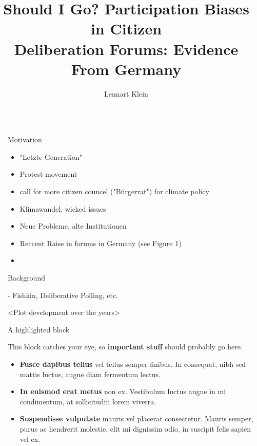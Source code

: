 \documentclass[final]{beamer}
\title{Should I Go? Participation Biases in Citizen\\ Deliberation Forums: Evidence From Germany}
\author{Lennart Klein \inst{1}}
\institute[shortinst]{\inst{1} University of Tübingen}
\newlength{\sepwidth}
\newlength{\colwidth}
\newcommand{\separatorcolumn}{\begin{column}{\sepwidth}\end{column}}
\begin{document}
\begin{frame}[t]
\begin{columns}[t]
\separatorcolumn

\begin{column}{\colwidth}

  \begin{block}{Motivation}

  \begin{itemize}
      \item "Letzte Generation"
      \item Protest movement 
      \item call for more citizen councel ("Bürgerrat") for climate policy
      \item Klimawandel, wicked issues
      \item Neue Probleme, alte Institutionen
      \item Reccent Raise in forums in Germany (see Figure 1)
      \item 
  \end{itemize}




  \end{block}

  \begin{block}{Background}

    
    - Fishkin, Deliberative Polling, etc.




    <Plot development over the years>


    

  \end{block}

  \begin{alertblock}{A highlighted block}

    This block catches your eye, so \textbf{important stuff} should probably go
    here.


    \begin{itemize}
      \item \textbf{Fusce dapibus tellus} vel tellus semper finibus. In
        consequat, nibh sed mattis luctus, augue diam fermentum lectus.
      \item \textbf{In euismod erat metus} non ex. Vestibulum luctus augue in
        mi condimentum, at sollicitudin lorem viverra.
      \item \textbf{Suspendisse vulputate} mauris vel placerat consectetur.
        Mauris semper, purus ac hendrerit molestie, elit mi dignissim odio, in
        suscipit felis sapien vel ex.
    \end{itemize}



\end{alertblock}
\end{column}
\end{columns}
\end{frame}
\end{document}
